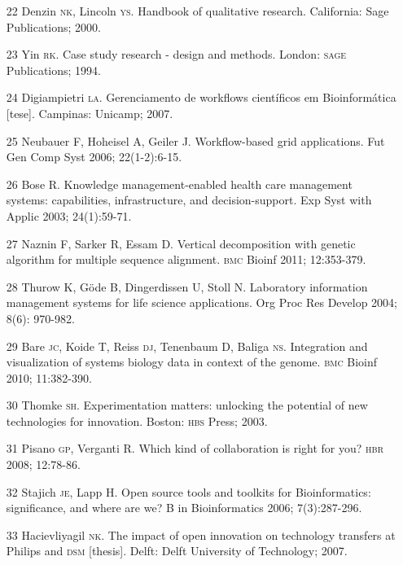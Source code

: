 \documentclass{article}
\begin{document}
\begin{itemize}
\item[22] Denzin \textsc{nk}, Lincoln \textsc{ys}. Handbook of qualitative research.
California: Sage Publications; 2000.

\item[23] Yin \textsc{rk}. Case study research - design and methods. London: \textsc{sage}
Publications; 1994.

\item[24] Digiampietri \textsc{la}. Gerenciamento de workflows científicos em
Bioinformática [tese]. Campinas: Unicamp; 2007.

\item[25] Neubauer F, Hoheisel A, Geiler J. Workflow-based grid
applications. Fut Gen Comp Syst 2006; 22(1-2):6-15.

\item[26] Bose R. Knowledge management-enabled health care management
systems: capabilities, infrastructure, and decision-support. Exp Syst with
Applic 2003; 24(1):59-71.

\item[27] Naznin F, Sarker R, Essam D. Vertical decomposition with genetic
algorithm for multiple sequence alignment. \textsc{bmc} Bioinf 2011; 12:353-379.

\item[28] Thurow K, Göde B, Dingerdissen U, Stoll N. Laboratory information
management systems for life science applications. Org Proc Res Develop 2004;
8(6): 970-982.

\item[29] Bare \textsc{jc}, Koide T, Reiss \textsc{dj}, Tenenbaum D, Baliga \textsc{ns}. Integration
and visualization of systems biology data in context of the genome. \textsc{bmc} Bioinf
2010; 11:382-390.

\item[30] Thomke \textsc{sh}. Experimentation matters: unlocking the potential of new
technologies for innovation. Boston: \textsc{hbs} Press; 2003.

\item[31] Pisano \textsc{gp}, Verganti R. Which kind of collaboration is right for
you? \textsc{hbr} 2008; 12:78-86.

\item[32] Stajich \textsc{je}, Lapp H. Open source tools and toolkits for
Bioinformatics: significance, and where are we? B in Bioinformatics 2006;
7(3):287-296.

\item[33] Hacievliyagil \textsc{nk}. The impact of open innovation on technology
transfers at Philips and \textsc{dsm} [thesis]. Delft: Delft University of Technology;
2007.


\end{itemize}
\end{document}

